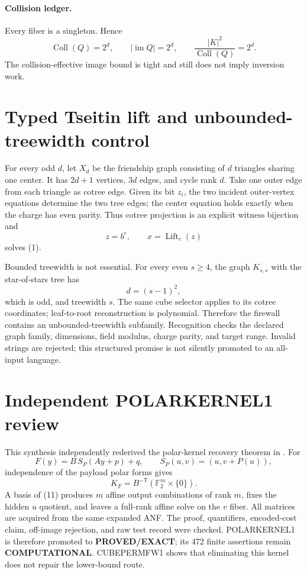 \documentclass[11pt]{article}
\newcommand{\F}{\mathbb F_2}
\newcommand{\EXACT}{\textbf{PROVED/EXACT}}
\newcommand{\COMP}{\textbf{COMPUTATIONAL}}
\begin{document}
\paragraph{Collision ledger.}
Every fiber is a singleton.  Hence
\[
 \operatorname{Coll}(Q)=2^d,
 \qquad |\operatorname{im}Q|=2^d,
 \qquad \frac{|K|^2}{\operatorname{Coll}(Q)}=2^d.       \tag{8}
\]
The collision-effective image bound is tight and still does not imply
inversion work.

\section{Typed Tseitin lift and unbounded-treewidth control}
For every odd $d$, let $X_d$ be the friendship graph consisting of $d$
triangles sharing one center.  It has $2d+1$ vertices, $3d$ edges, and cycle
rank $d$.  Take one outer edge from each triangle as cotree edge.  Given its
bit $z_i$, the two incident outer-vertex equations determine the two tree
edges; the center equation holds exactly when the charge has even parity.
Thus cotree projection is an explicit witness bijection and
\[
 z=b^e,\qquad x=\operatorname{Lift}_c(z)                \tag{9}
\]
solves (1).

Bounded treewidth is not essential.  For every even $s\ge4$, the graph
$K_{s,s}$ with the star-of-stars tree has
\[
 d=(s-1)^2,
\]
which is odd, and treewidth $s$.  The same cube selector applies to its
cotree coordinates; leaf-to-root reconstruction is polynomial.  Therefore
the firewall contains an unbounded-treewidth subfamily.  Recognition checks
the declared graph family, dimensions, field modulus, charge parity, and
target range.  Invalid strings are rejected; this structured promise is not
silently promoted to an all-input language.

\section{Independent POLARKERNEL1 review}
This synthesis independently rederived the polar-kernel recovery theorem in
.
For
\[
 F(y)=B\,S_P(Ay+p)+q,
 \qquad S_P(u,v)=(u,v+P(u)),                            \tag{10}
\]
independence of the payload polar forms gives
\[
 K_F=B^{-\mathsf T}(\F^m\times\{0\}).                  \tag{11}
\]
A basis of (11) produces $m$ affine output combinations of rank $m$,
fixes the hidden $u$ quotient, and leaves a full-rank affine solve on the
$v$ fiber.  All matrices are acquired from the same expanded ANF.  The proof,
quantifiers, encoded-cost claim, off-image rejection, and raw test record were
checked.  POLARKERNEL1 is therefore promoted to \EXACT{}; its 472 finite
assertions remain \COMP{}.  CUBEPERMFW1 shows that eliminating this kernel
does not repair the lower-bound route.
\end{document}
